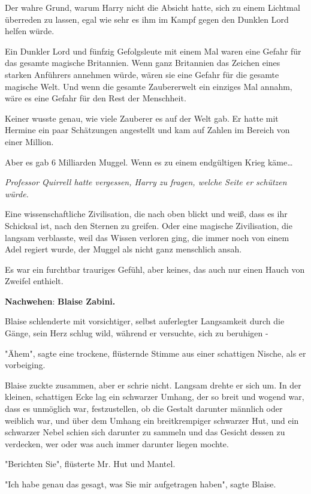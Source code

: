 {Der wahre Grund, warum Harry nicht die Absicht hatte, sich zu einem Lichtmal überreden zu lassen, egal wie sehr es ihm im Kampf gegen den Dunklen Lord helfen würde.

Ein Dunkler Lord und fünfzig Gefolgsleute mit einem Mal waren eine Gefahr für das gesamte magische Britannien. Wenn ganz Britannien das Zeichen eines starken Anführers annehmen würde, wären sie eine Gefahr für die gesamte magische Welt. Und wenn die gesamte Zaubererwelt ein einziges Mal annahm, wäre es eine Gefahr für den Rest der Menschheit.

Keiner wusste genau, wie viele Zauberer es auf der Welt gab. Er hatte mit Hermine ein paar Schätzungen angestellt und kam auf Zahlen im Bereich von einer Million.

Aber es gab 6 Milliarden Muggel. Wenn es zu einem endgültigen Krieg käme…

\emph{Professor Quirrell hatte vergessen, Harry zu fragen, welche Seite er schützen würde.}

Eine wissenschaftliche Zivilisation, die nach oben blickt und weiß, dass es ihr Schicksal ist, nach den Sternen zu greifen. Oder eine magische Zivilisation, die langsam verblasste, weil das Wissen verloren ging, die immer noch von einem Adel regiert wurde, der Muggel als nicht ganz menschlich ansah.

Es war ein furchtbar trauriges Gefühl, aber keines, das auch nur einen Hauch von Zweifel enthielt.

\textbf{Nachwehen}: \textbf{Blaise Zabini.}

Blaise schlenderte mit vorsichtiger, selbst auferlegter Langsamkeit durch die Gänge, sein Herz schlug wild, während er versuchte, sich zu beruhigen -

"Ähem", sagte eine trockene, flüsternde Stimme aus einer schattigen Nische, als er vorbeiging.

Blaise zuckte zusammen, aber er schrie nicht. Langsam drehte er sich um. In der kleinen, schattigen Ecke lag ein schwarzer Umhang, der so breit und wogend war, dass es unmöglich war, festzustellen, ob die Gestalt darunter männlich oder weiblich war, und über dem Umhang ein breitkrempiger schwarzer Hut, und ein schwarzer Nebel schien sich darunter zu sammeln und das Gesicht dessen zu verdecken, wer oder was auch immer darunter liegen mochte.

"Berichten Sie", flüsterte Mr. Hut und Mantel.

"Ich habe genau das gesagt, was Sie mir aufgetragen haben", sagte Blaise.

}
